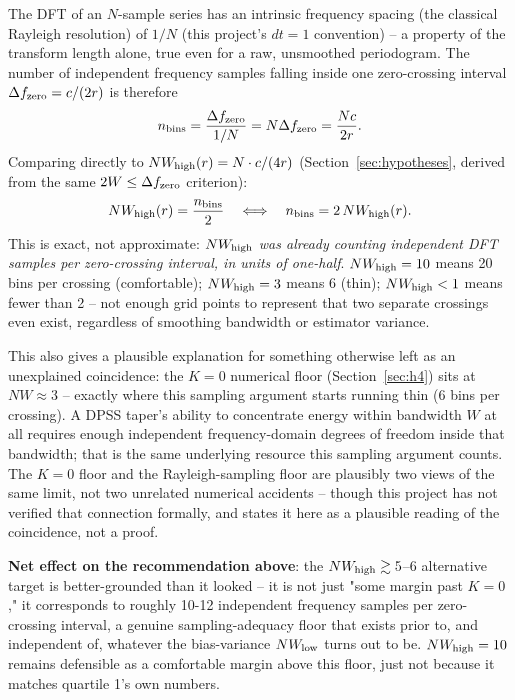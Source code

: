 \documentclass[11pt]{article}
\begin{document}
The DFT of an $N$-sample series has an intrinsic frequency spacing (the classical Rayleigh
resolution) of $1/N$ (this project's $dt=1$ convention) -- a property of the transform length
alone, true even for a raw, unsmoothed periodogram. The number of independent frequency samples
falling inside one zero-crossing interval $\Delta f_{\rm zero} = c/(2r)$ is therefore
\begin{equation}
  n_{\rm bins} = \frac{\Delta f_{\rm zero}}{1/N} = N\Delta f_{\rm zero} = \frac{Nc}{2r}.
\end{equation}
Comparing directly to $NW_{\rm high}(r) = N\cdot c/(4r)$ (Section~\ref{sec:hypotheses}, derived
from the same $2W\leq\Delta f_{\rm zero}$ criterion):
\begin{equation}
  NW_{\rm high}(r) = \frac{n_{\rm bins}}{2} \quad\Longleftrightarrow\quad n_{\rm bins} =
  2\, NW_{\rm high}(r).
\end{equation}
This is exact, not approximate: \emph{$NW_{\rm high}$ was already counting independent DFT
samples per zero-crossing interval, in units of one-half}. $NW_{\rm high}=10$ means 20 bins per
crossing (comfortable); $NW_{\rm high}=3$ means 6 (thin); $NW_{\rm high}<1$ means fewer than 2 --
not enough grid points to represent that two separate crossings even exist, regardless of
smoothing bandwidth or estimator variance.

This also gives a plausible explanation for something otherwise left as an unexplained
coincidence: the $K=0$ numerical floor (Section~\ref{sec:h4}) sits at $NW\approx 3$ -- exactly
where this sampling argument starts running thin (6 bins per crossing). A DPSS taper's ability to
concentrate energy within bandwidth $W$ at all requires enough independent frequency-domain
degrees of freedom inside that bandwidth; that is the same underlying resource this sampling
argument counts. The $K=0$ floor and the Rayleigh-sampling floor are plausibly two views of the
same limit, not two unrelated numerical accidents -- though this project has not verified that
connection formally, and states it here as a plausible reading of the coincidence, not a proof.

\textbf{Net effect on the recommendation above}: the $NW_{\rm high}\gtrsim 5$--$6$ alternative
target is better-grounded than it looked -- it is not just "some margin past $K=0$," it
corresponds to roughly 10-12 independent frequency samples per zero-crossing interval, a genuine
sampling-adequacy floor that exists prior to, and independent of, whatever the bias-variance
$NW_{\rm low}$ turns out to be. $NW_{\rm high}=10$ remains defensible as a comfortable margin
above this floor, just not because it matches quartile 1's own numbers.
\end{document}
